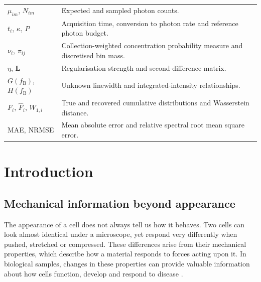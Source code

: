 \documentclass[11pt]{article}
\begin{document}
\begin{longtable}{@{}p{}p{}@{}}
$\mu_{im}$, $N_{im}$ & Expected and sampled photon counts. \\
$t_i$, $\kappa$, $P$ & Acquisition time, conversion to photon rate and reference photon budget. \\
$\nu_i$, $\pi_{ij}$ & Collection-weighted concentration probability measure and discretised bin mass. \\
$\eta$, $\mathbf L$ & Regularisation strength and second-difference matrix. \\
$G(f_{\mathrm B})$, $H(f_{\mathrm B})$ & Unknown linewidth and integrated-intensity relationships. \\
$F_i$, $\widehat F_i$, $W_{1,i}$ & True and recovered cumulative distributions and Wasserstein distance. \\
MAE, NRMSE & Mean absolute error and relative spectral root mean square error. \\
\bottomrule
\end{longtable}
\normalsize


\clearpage
\tableofcontents
\clearpage



\section{Introduction}
\label{sec:introduction}


\subsection{Mechanical information beyond appearance}

The appearance of a cell does not always tell us how it behaves. Two cells can look almost identical under a microscope, yet respond very differently when pushed, stretched or compressed. These differences arise from their mechanical properties, which describe how a material responds to forces acting upon it. In biological samples, changes in these properties can provide valuable information about how cells function, develop and respond to disease \citep{cross2007,discher2005,suresh2007}.
\end{document}
